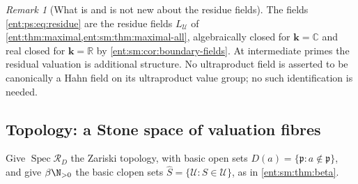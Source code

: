 \documentclass[11pt]{article}
\theoremstyle{plain}
\theoremstyle{plain}
\theoremstyle{plain}
\theoremstyle{definition}
\theoremstyle{definition}
\theoremstyle{definition}
\theoremstyle{definition}
\theoremstyle{remark}
\newtheorem{remark}[remark]{Remark}
\newcommand{\C}{\mathbb C}\newcommand{\R}{\mathbb R}
\DeclareMathOperator{\Spec}{Spec}\DeclareMathOperator{\red}{red}
\newcommand{\RD}{\mathcal R_D}\newcommand{\Ucal}{\mathcal U}
\newcommand{\kk}{\mathbf k}\newcommand{\PP}{\mathbb P}
\begin{document}
\begin{remark}[What is and is not new about the residue fields]
The fields \eqref{ent:ps:eq:residue} are the residue fields $L_\Ucal$ of
\cref{ent:thm:maximal,ent:sm:thm:maximal-all}, algebraically closed for
$\kk=\C$ and real closed for $\kk=\R$ by \cref{ent:sm:cor:boundary-fields}.
At intermediate primes the residual valuation is additional structure. No
ultraproduct field is asserted to be canonically a Hahn field on its
ultraproduct value group; no such identification is needed.
\end{remark}

\subsection{Topology: a Stone space of valuation fibres}
\label{ent:ps:subsec:topology}

Give $\Spec\RD$ the Zariski topology, with basic open sets
$D(a)=\{\mathfrak p:a\notin\mathfrak p\}$, and give $\beta\N_{>0}$ the basic
clopen sets $\widehat S=\{\Ucal:S\in\Ucal\}$, as in \cref{ent:sm:thm:beta}.
\end{document}
